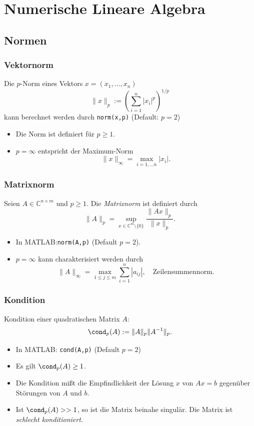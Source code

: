 \section{Numerische Lineare Algebra}

\subsection{Normen}
% 
%
\begin{frame}[fragile]\frametitle{Vektornorm}
 Die $p$-Norm eines Vektors $x=(x_1, {} \dots , x_n)$
\[ \|x \|_p := \left( \sum_{i=1}^n  |x_i|^p \right)^{1/p} \] 
kann berechnet werden durch \lstinline!norm(x,p)! (Default: $p=2$) 
\begin{itemize}
\item Die Norm ist definiert für $p\geq 1$.
\item $p=\infty$ entspricht der Maximum-Norm 
\[  \|x \|_\infty = \max_{i=1, \dots n} |x_i|. \]
\end{itemize}
\end{frame}
% 
%
\begin{frame}[fragile]\frametitle{Matrixnorm}
Seien  $A\in \mathbb{C}^{n \times m}$ und
$p \geq 1$. Die
{\it Matrixnorm} ist definiert durch
\[ \| A \|_p = \sup_{x\in \mathbb{C}^m \setminus \{ 0 \}} \frac{\|Ax
  \|_p}{\| x \|_p}. \]
\begin{itemize}
\item In MATLAB:\lstinline!norm(A,p)! (Default $p=2$).
\item $p=\infty$ kann charakterisiert werden durch
\[ \|A\|_\infty = \max_{1 \leq j \leq m} \sum_{i=1}^n |a_{ij}|, \quad
\mbox{Zeilensummennorm.} \]
\end{itemize} 
\end{frame}
% 
%
\begin{frame}[fragile]\frametitle{Kondition}
Kondition einer quadratischen Matrix $A$: 
{ \[ \cond_p(A):=\|A\|_p\|A^{-1}\|_p. \] }
\vspace*{-0.8cm}
\begin{itemize}
\item In MATLAB: 
  \lstinline!cond(A,p)! (Default $p=2$) 
\item Es gilt $\cond_p(A)\geq 1$.
\item Die Kondition mißt die Empfindlichkeit der Lösung $x$ von $Ax=b$
  gegenüber  Störungen
  von $A$ und $b$.
\item Ist $\cond_p(A) >> 1$, so ist die Matrix beinahe singulär. Die Matrix ist {\it schlecht konditioniert}.
\end{itemize}
\end{frame}
